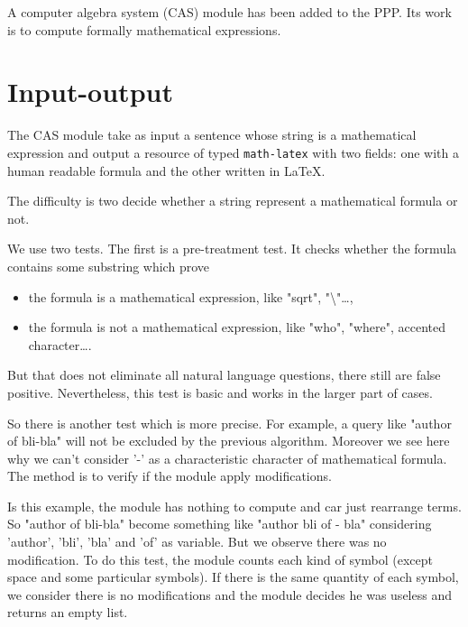 \newcommand{\CalChAS}{\text{C}\hspace{-2pt}_{\text{AL}}\hspace{-3pt}\text{C}^{\text{H}}{\hspace{-4pt}}_\text{AS}}
\newcommand{\RR}{\mathbb{R}}
\newcommand{\CC}{\mathbb{C}}
\newcommand{\ZZ}{\mathbb{Z}}
\newcommand{\NN}{\mathbb{N}}
\newcommand{\dd}{\mathrm{d}}


A computer algebra system (CAS) module has been added to the PPP. Its work is to compute formally mathematical expressions.

\section{Input-output}

The CAS module take as input a sentence whose string is a mathematical expression and output a resource of typed \texttt{math-latex} with two fields: one with a human readable formula and the other written in \LaTeX.

The difficulty is two decide whether a string represent a mathematical formula or not.

We use two tests. The first is a pre-treatment test. It checks whether the formula contains some substring which prove
\begin{itemize}
    \item the formula is a mathematical expression, like "sqrt", "\textbackslash"\ldots,
    \item the formula is not a mathematical expression, like "who", "where", accented character\ldots.
\end{itemize}

But that does not eliminate all natural language questions, there still are false positive. Nevertheless, this test is basic and works in the larger part of cases.

\bigskip

So there is another test which is more precise. For example, a query like "author of bli-bla" will not be excluded by the previous algorithm. Moreover we see here why we can't consider '-' as a characteristic character of mathematical formula. The method is to verify if the module apply modifications.

Is this example, the module has nothing to compute and car just rearrange terms. So "author of bli-bla" become something like "author bli of - bla" considering 'author', 'bli', 'bla' and 'of' as variable. But we observe there was no modification. To do this test, the module counts each kind of symbol (except space and some particular symbols). If there is the same quantity of each symbol, we consider there is no modifications and the module decides he was useless and returns an empty list.

